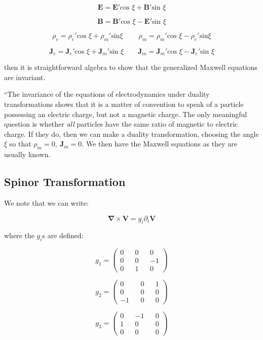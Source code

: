 \documentclass {article}
\renewcommand\vec{\mathbf}
\let\OldS\nabla
\renewcommand{\nabla}{\boldsymbol{\OldS}}
\begin{document}
$$\vec E = \vec E' \text{cos } \xi + \vec B'  \text{sin } \xi$$

$$\vec B = \vec B' \text{cos } \xi - \vec E'  \text{sin } \xi$$

$$\rho_e = \rho_e'  \text{cos } \xi  + \rho_m'  \text{sin} \xi  ~~~~~~~~~~ \rho_m = \rho_m'  \text{cos } \xi  - \rho_e'  \text{sin} \xi $$

$$\vec J_e = \vec J_e' \text{cos } \xi + \vec J_m' \text{sin } \xi ~~~~~~~~~ \vec J_m = \vec J_m' \text{cos } \xi  - \vec J_e' \text{sin } \xi $$

\noindent then it is straightforward algebra to show that the generalized Maxwell equations are invariant.

``The invariance of the equations of electrodynamics under duality transformations shows that it is a matter of convention to speak of a particle possessing an electric charge, but not a magnetic charge. The only meaningful question is whether \textit{all} particles have the same ratio of magnetic to electric charge. If they do, then we can make a duality transformation, choosing the angle $\xi$ so that $\rho_m = 0, ~ \vec J_m = 0$. We then have the Maxwell equations as they are usually known.

\newpage

\subsection{Spinor Transformation}

We note that we can write:

$$\nabla \times \vec V = g_i \partial_i \vec V $$

where the $g_i$s are defined:

$$g_1 = \left(\begin{matrix}  0 && 0 && 0 \\ 0 && 0 && -1 \\ 0 && 1 && 0 \end{matrix}\right) $$

$$g_2 = \left(\begin{matrix}  0 && 0 && 1 \\ 0 && 0 && 0 \\ -1 && 0 && 0 \end{matrix}\right) $$

$$g_3 = \left(\begin{matrix}  0 && -1 && 0 \\ 1 && 0 && 0 \\ 0 && 0 && 0 \end{matrix}\right) $$
\end{document}
